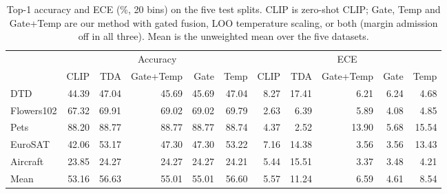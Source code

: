 \begin{table}[htbp]
\centering
\small\setlength{\tabcolsep}{4pt}
\begin{tabular}{lrrrrrrrrrr}
\toprule
 & \multicolumn{5}{c}{Accuracy} & \multicolumn{5}{c}{ECE} \\
\cmidrule(lr){2-6}\cmidrule(lr){7-11}
 & CLIP & TDA & Gate+Temp & Gate & Temp & CLIP & TDA & Gate+Temp & Gate & Temp \\
\midrule
DTD & 44.39 & 47.04 & 45.69 & 45.69 & 47.04 & 8.27 & 17.41 & 6.21 & 6.24 & 4.68 \\
Flowers102 & 67.32 & 69.91 & 69.02 & 69.02 & 69.79 & 2.63 & 6.39 & 5.89 & 4.08 & 4.85 \\
Pets & 88.20 & 88.77 & 88.77 & 88.77 & 88.74 & 4.37 & 2.52 & 13.90 & 5.68 & 15.54 \\
EuroSAT & 42.06 & 53.17 & 47.30 & 47.30 & 53.22 & 7.16 & 14.38 & 3.56 & 3.56 & 13.43 \\
Aircraft & 23.85 & 24.27 & 24.27 & 24.27 & 24.21 & 5.44 & 15.51 & 3.37 & 3.48 & 4.21 \\
Mean & 53.16 & 56.63 & 55.01 & 55.01 & 56.60 & 5.57 & 11.24 & 6.59 & 4.61 & 8.54 \\
\bottomrule
\end{tabular}
\caption{Top-1 accuracy and ECE (\%, 20 bins) on the five test splits. CLIP is zero-shot CLIP; Gate, Temp and Gate+Temp are our method with gated fusion, LOO temperature scaling, or both (margin admission off in all three). Mean is the unweighted mean over the five datasets.}
\label{tab:main}
\end{table}
